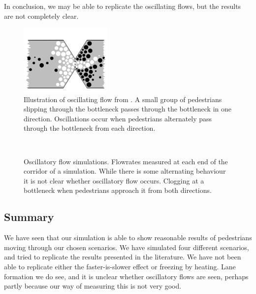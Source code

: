 In conclusion, we may be able to replicate the oscillating flows, but the 
results are not completely clear.
\begin{figure}[h]
    \centering
    \includegraphics[width=0.4\textwidth]{Figures/oscil_flow.png}
    \caption[Illustration of oscillating flow from \cite{oscil}]{Illustration 
    of oscillating flow from \cite{oscil}. A small group of pedestrians 
    slipping through the bottleneck passes through the bottleneck in one 
    direction. Oscillations occur when pedestrians alternately pass through 
    the bottleneck from each direction.}
    \label{fig:oscillitoryflow_litterature}
\end{figure}

\begin{figure}[h]
    \centering
    \\
    
    \caption[Oscillatory flow simulations]{Oscillatory flow simulations. 
     Flowrates measured at each end of the corridor 
    of a simulation. While there is some alternating behaviour it is not clear 
    whether oscillatory flow occurs.  Clogging at a 
    bottleneck when pedestrians approach it from both directions.}
    \label{fig:oscillatory-flow}
\end{figure}

\subsection{Summary}
We have seen that our simulation is able to show reasonable results of 
pedestrians moving through our chosen scenarios. We have simulated four 
different scenarios, and tried to replicate the results presented in the 
literature. We have not been able to replicate either the faster-is-slower 
effect or freezing by heating. Lane formation we do see, and it is unclear 
whether oscillatory flows are seen, perhaps partly because our way of 
measuring this is not very good.
